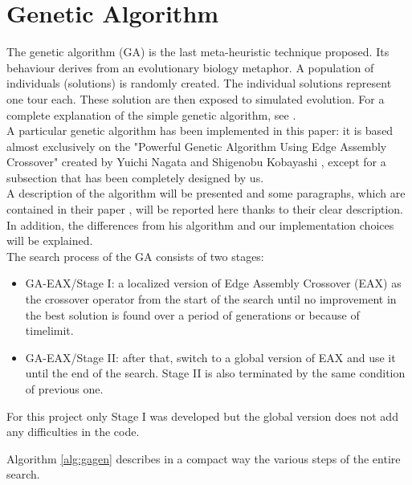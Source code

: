 \section{Genetic Algorithm}
The genetic algorithm (GA) is the last meta-heuristic technique proposed. Its behaviour derives from an evolutionary biology metaphor. A population of individuals (solutions) is randomly created. The individual solutions represent one tour each. These solution are then exposed to simulated evolution.
For a complete explanation of the simple genetic algorithm, see \cite{phdthesis}.\\
A particular genetic algorithm has been implemented in this paper: it is based almost exclusively on the "Powerful Genetic Algorithm Using Edge Assembly Crossover" created by Yuichi Nagata and Shigenobu Kobayashi \cite{Nagata2013, Honda2013}, except for a subsection that has been completely designed by us.\\ A description of the algorithm will be presented and some paragraphs, which are contained in their paper \cite{Nagata2013}, will be reported here thanks to their clear description. In addition, the differences from his algorithm and our implementation choices will be explained.\\
The search process of the GA consists of two stages: \\
\begin{itemize}
\item GA-EAX/Stage I: a localized version of Edge Assembly Crossover (EAX) as the crossover operator from the start of the search until no improvement in the best solution is found over a period of generations or because of timelimit.
\item  GA-EAX/Stage II: after that, switch to a global version of EAX and use it until the end of the search. Stage II is also terminated by the same condition of previous one.
\end{itemize}
For this project only Stage I was developed but the global version does not add any difficulties in the code.

Algorithm \ref{alg:gagen} describes in a compact way the various steps of the entire search.\\

